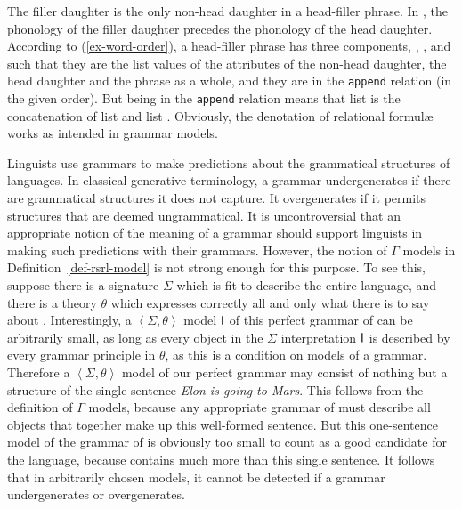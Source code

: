 \documentclass[output=paper
 	        ,biblatex
                ,babelshorthands
                ,newtxmath
                ,draftmode
                ,colorlinks, citecolor=brown
]{langscibook}
\begin{document}
{The filler daughter is the only non-head daughter in a head-filler phrase.
In , the phonology of the filler daughter precedes the phonology
of the head daughter. According to (\ref{ex-word-order}), a head-filler
phrase has three components, , , and  such that
they are the list values of the  attributes of the
non-head daughter, the head daughter and the phrase as a whole, and they
are in the \texttt{append} relation (in the given order). But being in the
\texttt{append} relation means that list  is the concatenation
of list  and list . Obviously, the denotation of relational
formulæ works as intended in grammar models.



Linguists use grammars to make predictions about the grammatical
structures of languages. In classical generative terminology, a
grammar undergenerates if there are grammatical structures it does not
capture. It overgenerates if it permits structures that are deemed
ungrammatical. It is uncontroversial that an appropriate notion of the
meaning of a grammar should support linguists in making such
predictions with their grammars. However, the notion of $\Gamma$
models in Definition~\ref{def-rsrl-model} is not strong enough for
this purpose. To see this, suppose there is a signature $\Sigma$ which
is fit to describe the entire  language, and there is a theory
$\theta$ which expresses correctly all and only what there is to say
about .  Interestingly, a $\left< \Sigma, \theta \right>$ model
$\mathsf{I}$ of this perfect grammar of  can be arbitrarily small, as
long as every object in the $\Sigma$ interpretation $\mathsf{I}$ is
described by every grammar principle in $\theta$, as this is a condition
on models of a grammar. Therefore a $\left< \Sigma, \theta \right>$
model of our perfect grammar may consist of nothing but a structure of
the single sentence \emph{Elon is going to Mars}. This follows from
the definition of $\Gamma$ models, because any appropriate grammar of
 must describe all objects that together make up this
well-formed sentence.  But this one-sentence model of the grammar of
 is obviously too small to count as a good candidate for
the  language, because  contains much more than this
single sentence. It follows that in arbitrarily chosen models, it
cannot be detected if a grammar undergenerates or overgenerates.


}
\end{document}
